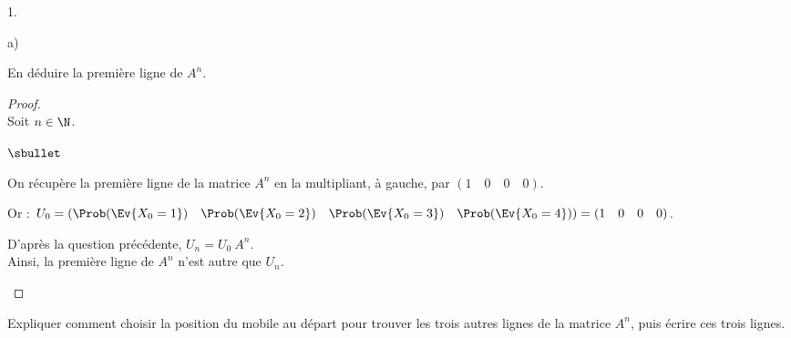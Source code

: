 \documentclass[11pt]{article}%
\begin{document}
\begin{noliste}{1.}
\begin{noliste}{a)}
  \item En déduire la première ligne de $A^{n}$.

    \begin{proof}~\\%
      Soit $n \in \N$.
      \begin{noliste}{$\sbullet$}
      \item On récupère la première ligne de la matrice $A^n$ en la
        multipliant, à gauche, par $(1 \quad 0 \quad 0 \quad 0)$.
      \item Or : $U_0 = (\Prob(\Ev{X_0 = 1}) \quad \Prob(\Ev{X_0 = 2})
        \quad \Prob(\Ev{X_0 = 3}) \quad \Prob(\Ev{X_0 = 4})) = (1
        \quad 0 \quad 0 \quad 0)$.
      \item D'après la question précédente, $U_n = U_0 \ A^n$.\\
        Ainsi, la première ligne de $A^n$ n'est autre que $U_n$.%
        ~\\[-1.2cm]
      \end{noliste}
    \end{proof}
  \end{noliste}
  
  
  
  
\item Expliquer comment choisir la position du mobile au départ pour
  trouver les trois autres lignes de la matrice $A^{n}$, puis écrire
  ces trois lignes.


\end{noliste}
\end{document}
